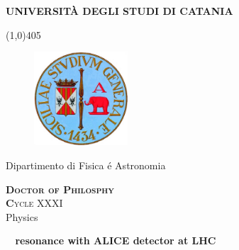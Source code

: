 \begin{titlepage}

\begin{center}
\begin{large}
\textbf{UNIVERSIT\`A DEGLI STUDI DI CATANIA} \\
\end{large}
\end{center}

\line(1,0){405} \\

\begin{figure}[htbp]
\begin{center}
\includegraphics[angle=0, height=3.5cm]{Images/Logo.jpg}
\end{center}
\end{figure}

\begin{center}
\begin{large}
Dipartimento di Fisica \'e Astronomia \\
\end{large}
\end{center}

\vspace{3pt}

\begin{center}
\begin{normalsize}
\textsc{ \textbf{Doctor of Philosphy}} \\
\vspace{2pt} 
\textsc{\textbf Cycle XXXI} \\
\vspace{3pt} 
Physics\\
\end{normalsize}
\end{center}

\vspace{2.0cm}
 
\begin{LARGE}
\begin{center}
\textbf{\kstarch~ resonance with ALICE detector at LHC}
\end{center}
\end{LARGE}


\end{titlepage}
